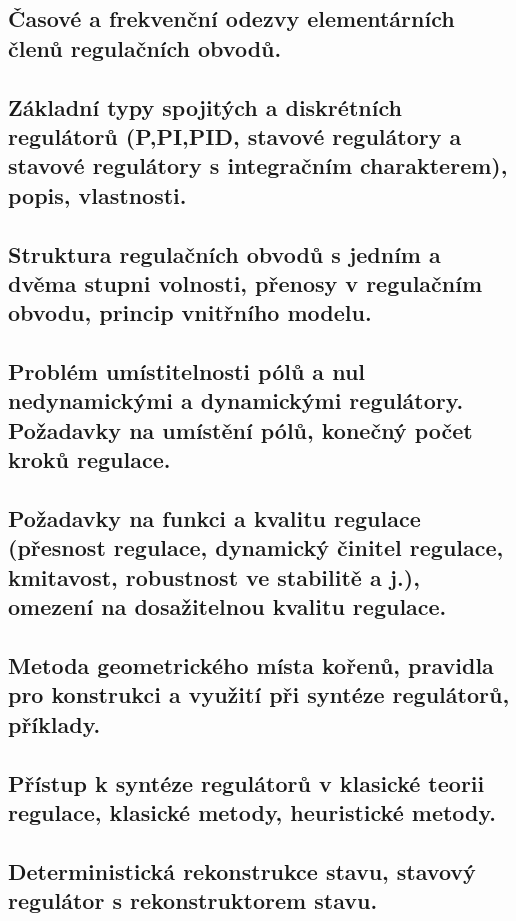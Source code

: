 \subsection{Časové a frekvenční odezvy elementárních členů regulačních obvodů.}

\subsection{Základní typy spojitých a diskrétních regulátorů (P,PI,PID, stavové regulátory a stavové regulátory s integračním charakterem), popis, vlastnosti.}

\subsection{Struktura regulačních obvodů s jedním a dvěma stupni volnosti, přenosy v regulačním obvodu, princip vnitřního modelu.}

\subsection{Problém umístitelnosti pólů a nul nedynamickými a dynamickými regulátory. Požadavky na umístění pólů, konečný počet kroků regulace.}

\subsection{Požadavky na funkci a kvalitu regulace (přesnost regulace, dynamický činitel regulace, kmitavost, robustnost ve stabilitě a j.), omezení na dosažitelnou kvalitu regulace.}

\subsection{Metoda geometrického místa kořenů, pravidla pro konstrukci a využití při syntéze regulátorů, příklady.}

\subsection{Přístup k syntéze regulátorů v klasické teorii regulace, klasické metody, heuristické metody.}

\subsection{Deterministická rekonstrukce stavu, stavový regulátor s rekonstruktorem stavu.}

